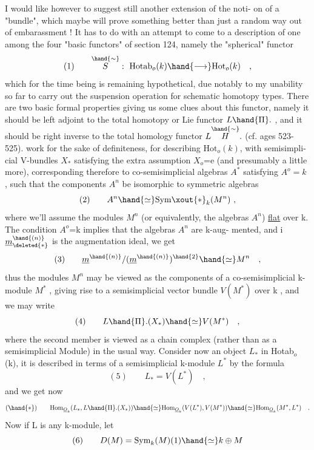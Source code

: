 
I would like however to suggest still another extension of the noti-%
on of a "bundle", which maybe will prove something better than just
a random way out of embarassment ! It has to do with an attempt to come
to a description of one among the four "basic functors" of section 124,
namely the "spherical" functor
\[ (1) \qquad \overset{\hand{\sim}}{S} : \ \mathrm{Hotab}_{o}(k) \hand{\longrightarrow} \mathrm{Hot}_{o}(k) \quad , \]
which for the time being is remaining hypothetical, due notably to my
unability so far to carry out the suspension operation for schematic
homotopy types. There are two basic formal properties giving us some
clues about this functor, namely it should be left adjoint to the
total homotopy or Lie functor $L\hand{\Pi}.$ , and it should be right inverse to
the  total homology functor $L\overset{\hand{\sim}}{H}.$ (cf. ages 523-525).  work for
the sake of definiteness,  for describing $\mathrm{Hot}_{o}(k)$, with semisimpli-%
cial V-bundles $X_{*}$ satisfying the extra assumption $X_{o}$=e (and presumably
a little more), corresponding therefore to co-semisimplicial algebras
$A^{*}$ satisfying $A^{o} = k$ , such that the components $A^{n}$ be isomorphic to
symmetric algebras
\[ (2) \qquad A^{n} \hand{\simeq} \mathrm{Sym}\xout{*}_{k}(M^{n}) \ , \]
where we'll assume the modules $M^{n}$ (or equivalently, the algebras $A^{n}$)
\uline{flat} over k. The condition $A^{o}$=k implies that the algebras $A^{n}$ are k-aug-%
mented, and i $\underline{m}^{\hand{(n)}}_{\deleted{*}}$ is the augmentation ideal, we get
\[ (3) \qquad \underline{m}^{\hand{(n)}}/(\underline{m}^{\hand{(n)}})^{\hand{2}} \hand{\simeq} M^{n} \quad , \]
thus the modules $M^{n}$ may be viewed as the components of a co-semisimplicial
k-module $M^{*}$ , giving rise to a semisimplicial vector bundle $V(M^{*})$ over
k , and we may write
\[ (4) \qquad L\hand{\Pi}.(X_{*}) \hand{\simeq} V(M^{*}) \quad , \]
where  the second member is viewed as a chain complex (rather than as a
semisimplicial Module) in the usual way.  Consider now an object
 $L_{*}$ in Hotab$_{o}$(k), it is described in terms of a semisimplicial
k-module $L^{*}$ by the formula
\[ (5) \qquad L_{*} = V(L^{*}) \quad , \]
and we get now
\[ (\hand{*}) \qquad \mathrm{Hom}_{\underline{O}_{k}}(L_{*},L\hand{\Pi}.(X_{*})) \hand{\simeq} \mathrm{Hom}_{\underline{O}_{k}}(V(L^{*}),V(M^{*})) \hand{\simeq} \mathrm{Hom}_{\underline{O}_{k}}(M^{*},L^{*}) \quad . \]
Now if L is any k-module, let
\[ (6) \qquad D(M) = \mathrm{Sym}_{k}(M)(1) \hand{\simeq} k \oplus M \]

